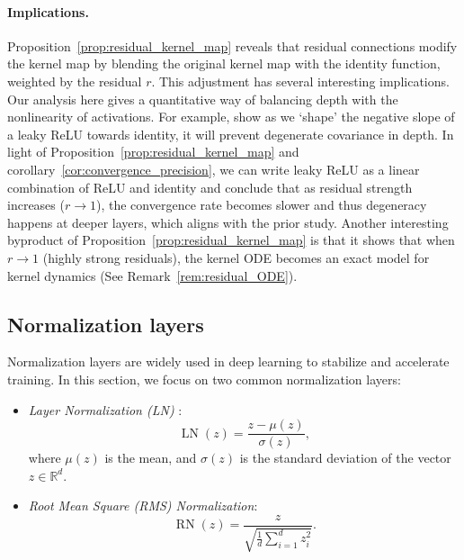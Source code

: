 \documentclass[twoside]{article}
\newcommand{\R}{\mathbb{R}}
\theoremstyle{definition}
\begin{document}
\paragraph{Implications.} Proposition~\ref{prop:residual_kernel_map} reveals that residual connections modify the kernel map by blending the original kernel map with the identity function, weighted by the residual $r$. This adjustment has several interesting implications. Our analysis here gives a quantitative way of balancing depth with the nonlinearity of activations. For example, \citet{li2022neural} show as we `shape' the negative slope of a leaky ReLU towards identity, it will prevent degenerate covariance in depth. In light of Proposition~\ref{prop:residual_kernel_map} and corollary~\ref{cor:convergence_precision}, we can write leaky ReLU as a linear combination of ReLU and identity and conclude that as residual strength increases ($r\to 1$), the convergence rate becomes slower and thus degeneracy happens at deeper layers, which aligns with the prior study. 
Another interesting byproduct of Proposition~\ref{prop:residual_kernel_map} is that it shows that when $r\to 1$ (highly strong residuals), the kernel ODE becomes an exact model for kernel dynamics (See Remark~\ref{rem:residual_ODE}).






\subsection{Normalization layers}

Normalization layers are widely used in deep learning to stabilize and accelerate training. In this section, we focus on two common normalization layers:
\begin{itemize}
    \item \textit{Layer Normalization (LN)} \citep{ba2016layer}:
  \begin{equation}
  \operatorname{LN}(z) = \frac{z - \mu(z)}{\sigma(z)},
  \end{equation}
  where $\mu(z)$ is the mean, and $\sigma(z)$ is the standard deviation of the vector $z \in \R^d$.
  \item \textit{Root Mean Square (RMS) Normalization}:
  \begin{equation}
  \operatorname{RN}(z) = \frac{z}{ \sqrt{ \frac{1}{d} \sum_{i=1}^d z_i^2 } }.
  \end{equation}
\end{itemize}
\end{document}
